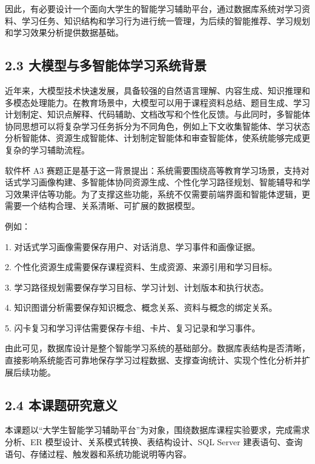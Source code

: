 \documentclass[10pt,a4paper,fontset=none]{ctexart}
\begin{document}
因此，有必要设计一个面向大学生的智能学习辅助平台，通过数据库系统对学习资料、学习任务、知识结构和学习行为进行统一管理，为后续的智能推荐、学习规划和学习效果分析提供数据基础。\par

\subsection*{2.3 大模型与多智能体学习系统背景}

近年来，大模型技术快速发展，具备较强的自然语言理解、内容生成、知识推理和多模态处理能力。在教育场景中，大模型可以用于课程资料总结、题目生成、学习计划制定、知识点解释、代码辅助、文档改写和个性化反馈。与此同时，多智能体协同思想可以将复杂学习任务拆分为不同角色，例如上下文收集智能体、学习状态分析智能体、资源生成智能体、计划制定智能体和审查智能体，使系统能够完成更复杂的学习辅助流程。\par

软件杯 A3 赛题正是基于这一背景提出：系统需要围绕高等教育学习场景，支持对话式学习画像构建、多智能体协同资源生成、个性化学习路径规划、智能辅导和学习效果评估等功能。为了支撑这些功能，系统不仅需要前端界面和智能体逻辑，更需要一个结构合理、关系清晰、可扩展的数据模型。\par

例如：\par

1. 对话式学习画像需要保存用户、对话消息、学习事件和画像证据。\par
2. 个性化资源生成需要保存课程资料、生成资源、来源引用和学习目标。\par
3. 学习路径规划需要保存学习目标、学习计划、计划版本和执行状态。\par
4. 知识图谱分析需要保存知识概念、概念关系、资料与概念的绑定关系。\par
5. 闪卡复习和学习评估需要保存卡组、卡片、复习记录和学习事件。\par

由此可见，数据库设计是整个智能学习系统的基础部分。数据库表结构是否清晰，直接影响系统能否可靠地保存学习过程数据、支撑查询统计、实现个性化分析并扩展后续功能。\par

\subsection*{2.4 本课题研究意义}

本课题以“大学生智能学习辅助平台”为对象，围绕数据库课程实验要求，完成需求分析、ER 模型设计、关系模式转换、表结构设计、SQL Server 建表语句、查询语句、存储过程、触发器和系统功能说明等内容。\par
\end{document}
